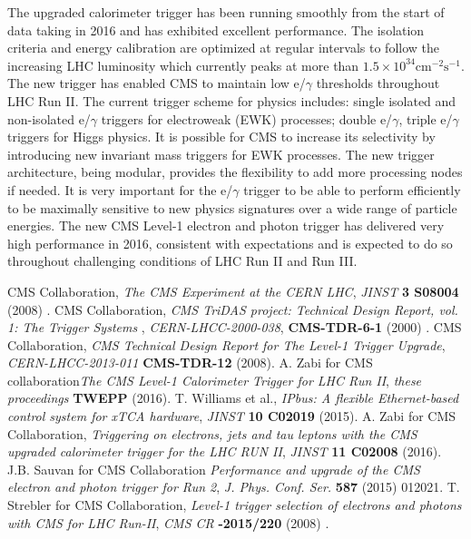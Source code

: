 \documentclass[a4paper,11pt]{article}
\begin{document}
The upgraded calorimeter trigger has been running smoothly from the start of data taking in 2016 and has exhibited excellent performance. The isolation criteria and energy calibration are optimized at regular intervals to follow the increasing LHC luminosity which currently peaks at more than $1.5 \times 10^{34} \mathrm{cm^{-2}s^{-1}}$. The new trigger has enabled CMS to maintain low e/$\gamma$  thresholds throughout LHC Run II. The current trigger scheme for physics includes: single isolated and non-isolated e/$\gamma$  triggers for electroweak (EWK) processes; double e/$\gamma$, triple e/$\gamma$ triggers for Higgs physics. It is possible for CMS to increase its selectivity by introducing new invariant mass triggers for EWK processes. The new trigger architecture, being modular, provides the flexibility to add more processing nodes if needed. It is very important for the e/$\gamma$ trigger to be able to perform efficiently to be maximally sensitive to new physics signatures over a wide range of particle energies. The new CMS Level-1 electron and photon trigger has delivered very high performance in 2016, consistent with expectations and is expected to do so throughout challenging conditions of LHC Run II and Run III.    
  
\begin{thebibliography}{}

CMS Collaboration, \emph{The CMS Experiment at the CERN LHC}, \emph{JINST} {\bf 3 S08004} (2008) .
CMS Collaboration, \emph{CMS TriDAS project: Technical Design Report, vol. 1: The Trigger Systems
}, \emph{CERN-LHCC-2000-038}, {\bf  CMS-TDR-6-1} (2000) .
CMS Collaboration, \emph{CMS Technical Design Report for The Level-1 Trigger Upgrade}, \emph{CERN-LHCC-2013-011} {\bf CMS-TDR-12} (2008).
A. Zabi for CMS collaboration\emph{The CMS Level-1 Calorimeter Trigger for LHC Run II}, \emph{these proceedings } {\bf TWEPP } (2016).
T. Williams et al., \emph{IPbus:  A  flexible  Ethernet-based  control  system  for  xTCA  hardware}, \emph{JINST} {\bf 10 C02019} (2015).
A. Zabi for CMS Collaboration, \emph{Triggering on electrons, jets and tau leptons  with the CMS upgraded calorimeter trigger for
the LHC RUN II}, \emph{JINST} {\bf 11 C02008} (2016).
J.B. Sauvan for CMS Collaboration \emph{Performance and upgrade of the CMS electron and photon trigger for
Run 2}, \emph{J. Phys. Conf. Ser.} {\bf 587} (2015) 012021.
T. Strebler for CMS Collaboration, \emph{Level-1 trigger selection of electrons and photons with CMS for LHC Run-II}, \emph{CMS CR} {\bf -2015/220} (2008) .
 




\end{thebibliography}
\end{document}
